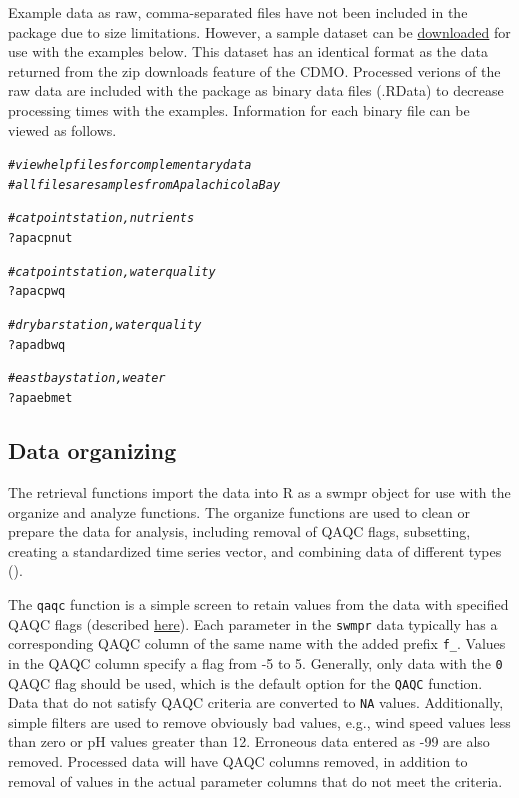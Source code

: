 \documentclass[10pt,letterpaper]{article}\usepackage[]{graphicx}\usepackage[]{color}
\makeatletter
\newcommand{\hlcom}[1]{\textcolor[rgb]{0.678,0.584,0.686}{\textit{#1}}}%
\newcommand{\hlopt}[1]{\textcolor[rgb]{0,0,0}{#1}}%
\newcommand{\hlstd}[1]{\textcolor[rgb]{0.345,0.345,0.345}{#1}}%
\newenvironment{kframe}{%
 \def\at@end@of@kframe{}%
 \ifinner\ifhmode%
  \def\at@end@of@kframe{\end{minipage}}%
  \begin{minipage}{\columnwidth}%
 \fi\fi%
 \def\FrameCommand##1{\hskip\@totalleftmargin \hskip-\fboxsep
 \colorbox{shadecolor}{##1}\hskip-\fboxsep
     \hskip-\linewidth \hskip-\@totalleftmargin \hskip\columnwidth}%
 \MakeFramed {\advance\hsize-\width
   \@totalleftmargin\z@ \linewidth\hsize
   \@setminipage}}%
 {\par\unskip\endMakeFramed%
 \at@end@of@kframe}
\newenvironment{knitrout}{}{} %
\makeatother
\begin{document}
Example data as raw, comma-separated files have not been included in the package due to size limitations.  However, a sample dataset can be \href{https://s3.amazonaws.com/swmpexdata/zip_ex.zip}{downloaded} for use with the examples below.  This dataset has an identical format as the data returned from the zip downloads feature of the \ac{CDMO}.  Processed verions of the raw data are included with the package as binary data files (.RData) to decrease processing times with the examples.  Information for each binary file can be viewed as follows.

\begin{knitrout}
\color{fgcolor}\begin{kframe}
\begin{alltt}
\hlcom{# view help files for complementary data}
\hlcom{# all files are samples from Apalachicola Bay}

\hlcom{# cat point station, nutrients}
\hlopt{?}\hlstd{apacpnut}

\hlcom{# cat point station, water quality}
\hlopt{?}\hlstd{apacpwq}

\hlcom{# dry bar station, water quality}
\hlopt{?}\hlstd{apadbwq}

\hlcom{# east bay station, weater}
\hlopt{?}\hlstd{apaebmet}
\end{alltt}
\end{kframe}
\end{knitrout}

\subsection*{Data organizing}

The retrieval functions import the data into R as a swmpr object for use with the organize and analyze functions. The organize functions are used to clean or prepare the data for analysis, including removal of QAQC flags, subsetting, creating a standardized time series vector, and combining data of different types ().

The \texttt{qaqc} function is a simple screen to retain values from the data with specified QAQC flags (described \href{http://cdmo.baruch.sc.edu/data/qaqc.cfm}{here}).  Each parameter in the \texttt{swmpr} data typically has a corresponding QAQC column of the same name with the added prefix \texttt{f\_}.  Values in the QAQC column specify a flag from -5 to 5.  Generally, only data with the  \texttt{0} \ac{QAQC} flag should be used, which is the default option for the \texttt{QAQC} function.  Data that do not satisfy \ac{QAQC} criteria are converted to \texttt{NA} values.   Additionally, simple filters are used to remove obviously bad values, e.g., wind speed values less than zero or pH values greater than 12. Erroneous data entered as -99 are also removed. Processed data will have QAQC columns removed, in addition to removal of values in the actual parameter columns that do not meet the criteria. 
\end{document}
